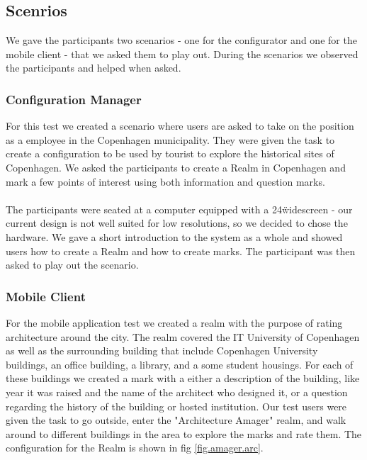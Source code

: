 \subsection{Scenrios} %
\label{sub:scenrios}
We gave the participants two scenarios - one for the configurator and one for the mobile client - that we asked them to play out. During the scenarios we observed the participants and helped when asked.

\subsubsection{Configuration Manager} %
\label{sub:configuration_manager_evaluation}
For this test we created a scenario where users are asked to take on the position as a employee in the Copenhagen municipality. They were given the task to create a configuration to be used by tourist to explore the historical sites of Copenhagen. We asked the participants to create a Realm in Copenhagen and mark a few points of interest using both information and question marks.
\\\\
The participants were seated at a computer equipped with a 24\" widescreen - our current design is not well suited for low resolutions, so we decided to chose the hardware. We gave a short introduction to the system as a whole and showed users how to create a Realm and how to create marks. The participant was then asked to play out the scenario.

\subsubsection{Mobile Client} %
\label{sub:android_application_evaluation}
For the mobile application test we created a realm with the purpose of rating architecture around the city. The realm covered the IT University of Copenhagen as well as the surrounding building that include Copenhagen University buildings, an office building, a library, and a some student housings. For each of these buildings we created a mark with a either a description of the building, like year it was raised and the name of the architect who designed it, or a question regarding the history of the building or hosted institution. Our test users were given the task to go outside, enter the "Architecture Amager" realm, and walk around to different buildings in the area to explore the marks and rate them. The configuration for the Realm is shown in fig \ref{fig.amager.arc}.

